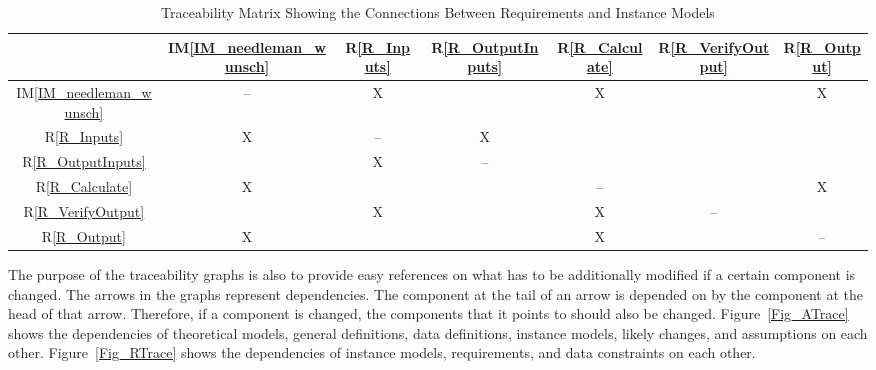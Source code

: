 \documentclass[12pt]{article}
\newcommand{\iref}[1]{IM\ref{#1}}
\newcommand{\rref}[1]{R\ref{#1}}
\begin{document}


\begin{table}[h!]
\centering
\begin{tabular}{|c|c|c|c|c|c|c|}
\hline
  & \iref{IM_needleman_wunsch} & \rref{R_Inputs} & \rref{R_OutputInputs} & \rref{R_Calculate} & \rref{R_VerifyOutput} & \rref{R_Output} \\ \hline
\iref{IM_needleman_wunsch} & -- & X & & X & & X \\ \hline
\rref{R_Inputs} & X & -- & X & & & \\ \hline
\rref{R_OutputInputs} & & X & -- & & & \\ \hline
\rref{R_Calculate} & X & & & -- & & X \\ \hline
\rref{R_VerifyOutput} & & X & & X & -- & \\ \hline
\rref{R_Output} & X & & & X & & -- \\ \hline
\end{tabular}
\caption{Traceability Matrix Showing the Connections Between Requirements and Instance Models}
\label{Table:R_trace}
\end{table}

The purpose of the traceability graphs is also to provide easy references on
what has to be additionally modified if a certain component is changed.  The
arrows in the graphs represent dependencies. The component at the tail of an
arrow is depended on by the component at the head of that arrow. Therefore, if a
component is changed, the components that it points to should also be
changed. Figure~\ref{Fig_ATrace} shows the dependencies of theoretical models,
general definitions, data definitions, instance models, likely changes, and
assumptions on each other. Figure~\ref{Fig_RTrace} shows the dependencies of
instance models, requirements, and data constraints on each other.
\end{document}
